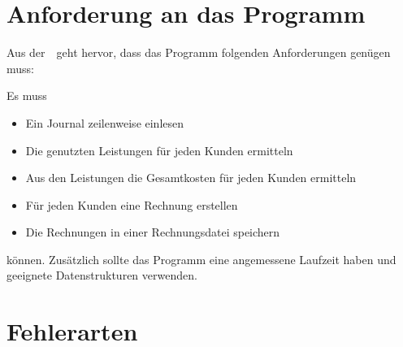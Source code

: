 \section{Anforderung an das Programm}\label{sec:anforderung-an-das-programm}
Aus der~~geht hervor, dass das Programm folgenden Anforderungen genügen muss:

Es muss
\begin{itemize}[noitemsep]
    \item Ein Journal zeilenweise einlesen
    \item Die genutzten Leistungen für jeden Kunden ermitteln
    \item Aus den Leistungen die Gesamtkosten für jeden Kunden ermitteln
    \item Für jeden Kunden eine Rechnung erstellen
    \item Die Rechnungen in einer Rechnungsdatei speichern
\end{itemize}
können.
Zusätzlich sollte das Programm eine angemessene Laufzeit haben und geeignete Datenstrukturen verwenden.

\section{Fehlerarten}\label{sec:fehlerarten}





